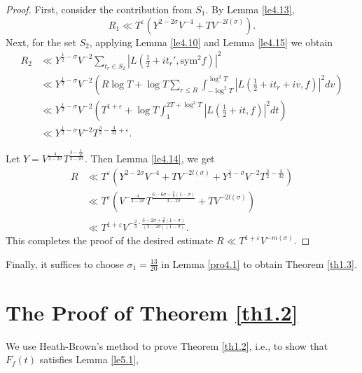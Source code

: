 \documentclass[10pt,leqno]{amsart}
\numberwithin{equation}{section}
\begin{document}
\begin{proof}
First, consider the contribution from $S_1$. By Lemma \ref{le4.13},
\begin{equation}\label{eq4.53}
R_1 \ll T^\varepsilon \left( Y^{2 - 2\sigma} V^{-4} + T V^{-2l(\sigma)} \right).
\end{equation}
Next, for the set $S_2$, applying Lemma \ref{le4.10} and Lemma \ref{le4.15} we obtain
\[
\begin{aligned}
R_2 &\ll Y^{\frac{1}{2} - \sigma} V^{-2} \sum_{t_r \in S_2} \left| L\left( \tfrac{1}{2} + i t_r', \mathrm{sym}^2 f \right) \right|^2 \\
&\ll Y^{\frac{1}{2} - \sigma} V^{-2} \left( R \log T + \log T \sum_{r \le R} \int_{-\log^2 T}^{\log^2 T} \left| L\left( \tfrac{1}{2} + i t_r + i v, f \right) \right|^2   dv \right) \\
&\ll Y^{\frac{1}{2} - \sigma} V^{-2} \left( T^{1+\varepsilon} + \log T \int_{1}^{2T + \log^2 T} \left| L\left( \tfrac{1}{2} + i t, f \right) \right|^2   dt \right) \\
&\ll Y^{\frac{1}{2} - \sigma} V^{-2} T^{\frac{3}{2} - \frac{3}{32} + \varepsilon}.
\end{aligned}
\]

Let $Y = V^{\frac{4}{3-2\sigma}} T^{\frac{3 - \frac{3}{16}}{3-2\sigma}}$. Then Lemma \ref{le4.14}, we get
\[
\begin{aligned}
R &\ll T^\varepsilon \left( Y^{2-2\sigma} V^{-4} + T V^{-2l(\sigma)} + Y^{\frac{1}{2}-\sigma} V^{-2} T^{\frac{3}{2} - \frac{3}{32}} \right) \\
  &\ll T^\varepsilon \left( V^{-\frac{4}{3-2\sigma}} T^{\frac{6-6\sigma - \frac{3}{8}(1-\sigma)}{3-2\sigma}} + T V^{-2l(\sigma)} \right) \\
  &\ll T^{1+\varepsilon} V^{-   \frac{2}{3} \cdot \frac{3-2\sigma + \frac{3}{8}(1-\sigma)}{(3-2\sigma)(1-\sigma)}}.
\end{aligned}
\]
This completes the proof of the desired estimate $R \ll T^{1+\varepsilon} V^{-m(\sigma)}$.
\end{proof}

Finally, it suffices to choose $\sigma_1=\frac{13}{20}$ in Lemma \ref{pro4.1} to obtain Theorem \ref{th1.3}.

\section{The Proof of Theorem \ref{th1.2}}

 We use Heath-Brown's method \cite{MR1159354} to prove Theorem \ref{th1.2}, i.e., to show that $F_f(t)$ satisfies Lemma \ref{le5.1},
\end{document}
